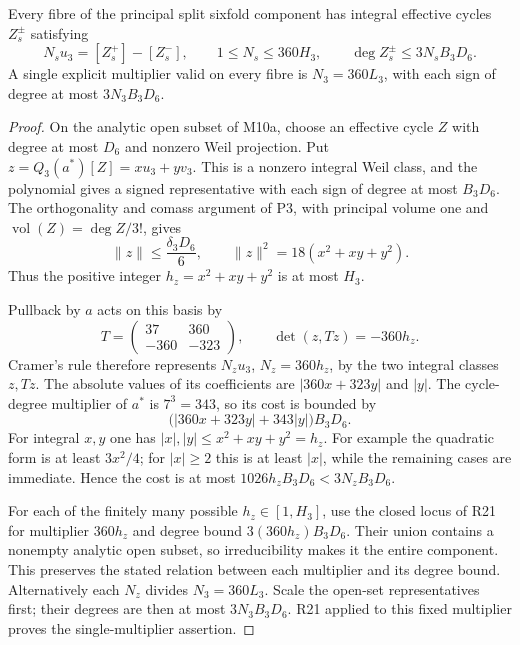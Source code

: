 \begin{proposition}\label{M10b}
Every fibre of the principal split sixfold component has integral
effective cycles $Z_s^\pm$ satisfying
\[
 N_su_3=[Z_s^+]-[Z_s^-],\qquad
 1\le N_s\le360H_3,\qquad
 \deg Z_s^\pm\le3N_sB_3D_6.
\]
A single explicit multiplier valid on every fibre is
$N_3=360L_3$, with each sign of degree at most $3N_3B_3D_6$.
\end{proposition}
\begin{proof}
On the analytic open subset of M10a, choose an effective cycle
$Z$ with degree at most $D_6$ and nonzero Weil projection.
Put
$z=Q_3(a^*)[Z]=xu_3+yv_3$.
This is a nonzero integral Weil class, and the polynomial gives
a signed representative with each sign of degree at most $B_3D_6$.
The orthogonality and comass argument of P3, with principal volume
one and $\operatorname{vol}(Z)=\deg Z/3!$, gives
\[
 \|z\|\le\frac{\delta_3D_6}{6},\qquad
 \|z\|^2=18(x^2+xy+y^2).
\]
Thus the positive integer $h_z=x^2+xy+y^2$ is at most $H_3$.

Pullback by $a$ acts on this basis by
\[
 T=\begin{pmatrix}37&360\\-360&-323\end{pmatrix},\qquad
 \det(z,Tz)=-360h_z.
\]
Cramer's rule therefore represents
$N_zu_3$, $N_z=360h_z$, by the two integral classes $z,Tz$.
The absolute values of its coefficients are
$|360x+323y|$ and $|y|$.
The cycle-degree multiplier of $a^*$ is $7^3=343$, so its cost
is bounded by
\[
 \bigl(|360x+323y|+343|y|\bigr)B_3D_6.
\]
For integral $x,y$ one has $|x|,|y|\le x^2+xy+y^2=h_z$.
For example the quadratic form is at least $3x^2/4$; for
$|x|\ge2$ this is at least $|x|$, while the remaining cases are
immediate. Hence the cost is at most
$1026h_zB_3D_6<3N_zB_3D_6$.

For each of the finitely many possible $h_z\in[1,H_3]$, use the
closed locus of R21 for multiplier $360h_z$ and degree bound
$3(360h_z)B_3D_6$. Their union contains a nonempty analytic open
subset, so irreducibility makes it the entire component.
This preserves the stated relation between each multiplier and
its degree bound. Alternatively each $N_z$ divides $N_3=360L_3$.
Scale the open-set representatives first; their degrees are then
at most $3N_3B_3D_6$. R21 applied to this fixed multiplier proves
the single-multiplier assertion.
\end{proof}


